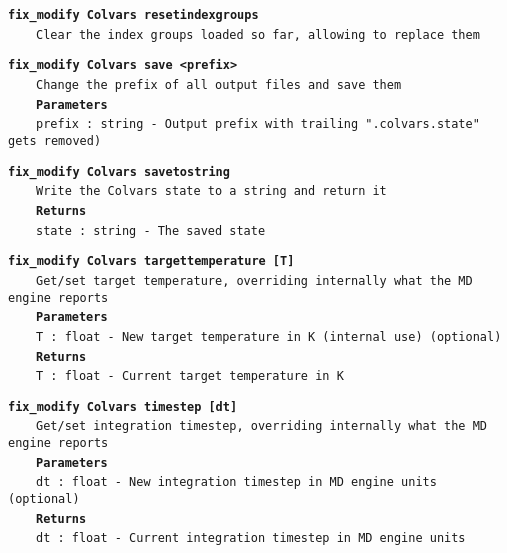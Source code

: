 \begin{mdexampleinput}{}
\texttt{\textbf{fix\_modify Colvars resetindexgroups}}
\\
\-~~~~\texttt{Clear the index groups loaded so far, allowing to replace them}
\end{mdexampleinput}
\begin{mdexampleinput}{}
\texttt{\textbf{fix\_modify Colvars save <prefix>}}
\\
\-~~~~\texttt{Change the prefix of all output files and save them}
\\
\-~~~~\texttt{\textbf{Parameters}}
\\
\-~~~~\texttt{prefix : string - Output prefix with trailing ".colvars.state" gets removed)}
\end{mdexampleinput}
\begin{mdexampleinput}{}
\texttt{\textbf{fix\_modify Colvars savetostring}}
\\
\-~~~~\texttt{Write the Colvars state to a string and return it}
\\
\-~~~~\texttt{\textbf{Returns}}
\\
\-~~~~\texttt{state : string - The saved state}
\end{mdexampleinput}
\begin{mdexampleinput}{}
\texttt{\textbf{fix\_modify Colvars targettemperature [T]}}
\\
\-~~~~\texttt{Get/set target temperature, overriding internally what the MD engine reports}
\\
\-~~~~\texttt{\textbf{Parameters}}
\\
\-~~~~\texttt{T : float - New target temperature in K (internal use) (optional)}
\\
\-~~~~\texttt{\textbf{Returns}}
\\
\-~~~~\texttt{T : float - Current target temperature in K}
\end{mdexampleinput}
\begin{mdexampleinput}{}
\texttt{\textbf{fix\_modify Colvars timestep [dt]}}
\\
\-~~~~\texttt{Get/set integration timestep, overriding internally what the MD engine reports}
\\
\-~~~~\texttt{\textbf{Parameters}}
\\
\-~~~~\texttt{dt : float - New integration timestep in MD engine units (optional)}
\\
\-~~~~\texttt{\textbf{Returns}}
\\
\-~~~~\texttt{dt : float - Current integration timestep in MD engine units}
\end{mdexampleinput}
